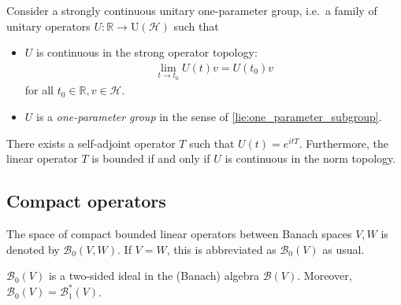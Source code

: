    \begin{theorem}[Stone]\label{functional:stone}
        Consider a strongly continuous unitary one-parameter group, i.e.~a family of unitary operators $U:\mathbb{R}\rightarrow\mathrm{U}(\mathcal{H})$ such that
        \begin{itemize}
            \item $U$ is continuous in the strong operator topology:
            \begin{gather}
                \lim_{t\rightarrow t_0}U(t)v=U(t_0)v
            \end{gather}
            for all $t_0\in\mathbb{R},v\in\mathcal{H}$.
            \item $U$ is a \textit{one-parameter group} in the sense of \cref{lie:one_parameter_subgroup}.
        \end{itemize}
        There exists a self-adjoint operator $T$ such that $U(t)=e^{itT}$. Furthermore, the linear operator $T$ is bounded if and only if $U$ is continuous in the norm topology.
    \end{theorem}

\subsection{Compact operators}



    \begin{notation}
        The space of compact bounded linear operators between Banach spaces $V,W$ is denoted by $\mathcal{B}_0(V,W)$. If $V=W$, this is abbreviated as $\mathcal{B}_0(V)$ as usual.
    \end{notation}
    \begin{property}
        $\mathcal{B}_0(V)$ is a two-sided ideal in the (Banach) algebra $\mathcal{B}(V)$. Moreover, $\mathcal{B}_0(V)=\mathcal{B}_1^*(V)$.
    \end{property}

